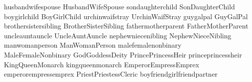 \mfornb{\spouse}	{husband}{wife}{spouse}
\mfornb{\Spouse}	{Husband}{Wife}{Spouse}
\mfornb{\offspring}	{son}{daughter}{child}
\mfornb{\Offspring}	{Son}{Daughter}{Child}
\mfornb{\child}		{boy}{girl}{child}
\mfornb{\Child}		{Boy}{Girl}{Child}
\mfornb{\stray}	{urchin}{waif}{stray}
\mfornb{\Stray}	{Urchin}{Waif}{Stray}
\mfornb{\pal}		{guy}{gal}{pal}
\mfornb{\Pal}		{Guy}{Gal}{Pal}
\mfornb{\sibling}	{brother}{sister}{sibling}
\mfornb{\Sibling}	{Brother}{Sister}{Sibling}
\mfornb{\parent}	{father}{mother}{parent}
\mfornb{\Parent}	{Father}{Mother}{Parent}
\mfornb{\auncle}	{uncle}{aunt}{auncle}
\mfornb{\Auncle}	{Uncle}{Aunt}{Auncle}
\mfornb{\nibling}	{nephew}{niece}{nibling}
\mfornb{\Nibling}	{Nephew}{Niece}{Nibling}
\mfornb{\person}	{man}{woman}{person} %
\mfornb{\Person}	{Man}{Woman}{Person}
\mfornb{\sex}		{male}{female}{nonbinary}
\mfornb{\Sex}		{Male}{Female}{Nonbinary}
\mfornb{\Deity}		{God}{Goddess}{Deity}
\def\God\Deity
\mfornb{\Heir}		{Prince}{Princess}{Heir}
\mfornb{\heir}		{prince}{princess}{heir}
\mfornb{\Monarch}		{King}{Queen}{Monarch}
\mfornb{\monarch}		{king}{queen}{monarch}
\mfornb{\Emperor}		{Emperor}{Empress}{Emprex}
\mfornb{\emperor}		{emperor}{empress}{emprex}
\mfornb{\cleric}		{Priest}{Priestess}{Cleric}
\mfornb{\partner}	{boyfriend}{girlfriend}{partner}


	

